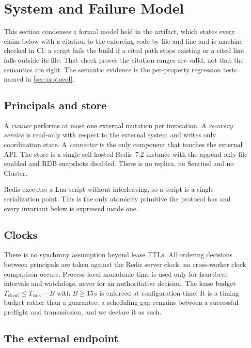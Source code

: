 \section{System and Failure Model}
\label{sec:model}

This section condenses a formal model held in the
artifact, which states every claim below with a citation to the enforcing
code by file and line and is machine-checked in CI: a script fails the build if a
cited path stops existing or a cited line falls outside its file. That check
proves the citation ranges are valid, not that the semantics are right. The
semantic evidence is the per-property regression tests named in
\cref{sec:protocol}.

\subsection{Principals and store}

A \emph{runner} performs at most one external mutation per invocation. A
\emph{recovery service} is read-only with respect to the external system and
writes only coordination state. A \emph{connector} is the only component that
touches the external API. The store is a single self-hosted Redis~7.2 instance
with the append-only file enabled and RDB snapshots disabled. There is no
replica, no Sentinel and no Cluster.

Redis executes a Lua script without interleaving, so a script is a single
serialization point. This is the only atomicity primitive the protocol has and
every invariant below is expressed inside one.

\subsection{Clocks}
\label{sec:model-clocks}

There is no synchrony assumption beyond lease TTLs. All ordering decisions
between principals are taken against the Redis server clock; no cross-worker
clock comparison occurs. Process-local monotonic time is used only for
heartbeat intervals and watchdogs, never for an authoritative decision. The
lease budget $T_{\text{client}} \le T_{\text{lock}} - B$ with $B \ge 15$\,s is
enforced at configuration time. It is a timing budget rather than a
guarantee: a scheduling gap remains between a successful preflight and
transmission, and we declare it as such.

\subsection{The external endpoint}
\label{sec:model-endpoint}

